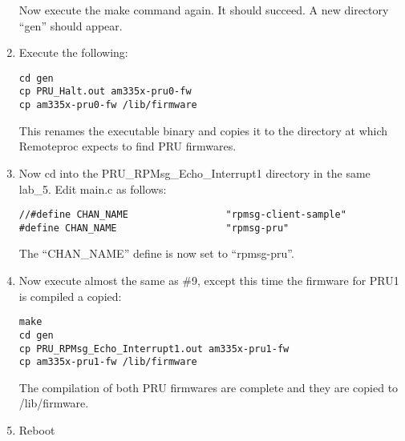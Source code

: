\begin{enumerate}
Now execute the make command again.  It should succeed.  A new directory ``gen'' should appear.
\item  Execute the following:
\begin{verbatim}
cd gen
cp PRU_Halt.out am335x-pru0-fw
cp am335x-pru0-fw /lib/firmware
\end{verbatim}
This renames the executable binary and copies it to the directory at which Remoteproc expects to find PRU firmwares.
\item  Now cd into the PRU\_RPMsg\_Echo\_Interrupt1 directory in the same lab\_5.
Edit main.c as follows:
\begin{verbatim}
//#define CHAN_NAME					"rpmsg-client-sample"
#define CHAN_NAME					"rpmsg-pru"
\end{verbatim}
The ``CHAN\_NAME'' define is now set to ``rpmsg-pru''.
\item  Now execute almost the same as \#9, except this time the firmware for PRU1 is compiled a copied:
\begin{verbatim}
make
cd gen
cp PRU_RPMsg_Echo_Interrupt1.out am335x-pru1-fw
cp am335x-pru1-fw /lib/firmware
\end{verbatim}
The compilation of both PRU firmwares are complete and they are copied to /lib/firmware.
\item  Reboot
\end{enumerate}


